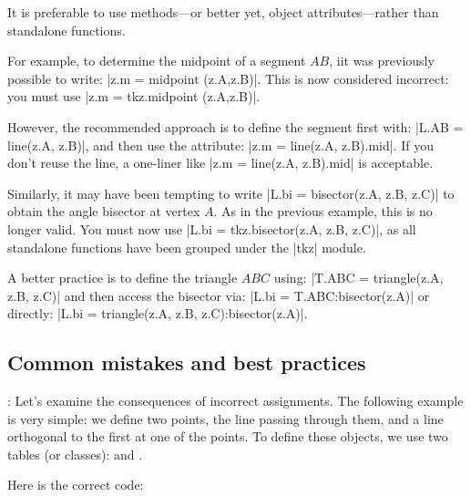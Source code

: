 It is preferable to use methods—or better yet, object attributes—rather than standalone functions.

For example, to determine the midpoint of a segment $AB$, iit was previously possible to write: |z.m = midpoint (z.A,z.B)|.  This is now considered incorrect: you must use |z.m = tkz.midpoint (z.A,z.B)|.

However, the recommended approach is to define the segment first with: |L.AB = line(z.A, z.B)|, and then use the attribute: |z.m = line(z.A, z.B).mid|. If you don't reuse the line, a one-liner like |z.m = line(z.A, z.B).mid| is acceptable.

\vspace{12pt}
Similarly, it may have been tempting to write |L.bi = bisector(z.A, z.B, z.C)| to obtain the angle bisector at vertex $A$. As in the previous example, this is no longer valid. You must now use |L.bi = tkz.bisector(z.A, z.B, z.C)|, as all standalone functions have been grouped under the |tkz| module.

A better practice is to define the triangle $ABC$ using:  |T.ABC = triangle(z.A, z.B, z.C)| and then access the bisector via: |L.bi = T.ABC:bisector(z.A)| or directly: |L.bi = triangle(z.A, z.B, z.C):bisector(z.A)|.


\subsection{Common mistakes and best practices}

\vspace{1em}
\tkzRHand{\textcolor{red}{Second Warning}}: Let's examine the consequences of incorrect assignments. The following example is very simple: we define two points, the line passing through them, and a line orthogonal to the first at one of the points. To define these objects, we use two tables (or classes):  and .

Here is the correct code:
\begin{tkzexample}[latex=.5\textwidth]
\end{tkzexample}

